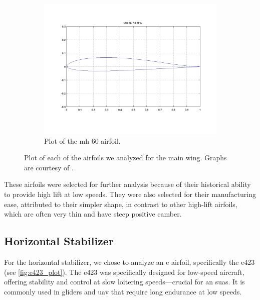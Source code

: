 \begin{figure}[htpb]
    \begin{subfigure}{0.49\textwidth}
        \centering
        \includegraphics[width=\textwidth]{Figures/MH_60.png}
        \caption{Plot of the \acrshort{mh} 60 airfoil.}
        \label{fig:mh_60_plot}
    \end{subfigure}
    \caption[Airfoil choices for wing]{Plot of each of the airfoils we analyzed for the main wing. Graphs are courtesy of \citet{uiuc2024}.}
    \label{fig:airfoil_plots}
\end{figure}

These airfoils were selected for further analysis because of their historical ability to provide high lift at low speeds. They were also selected for their manufacturing ease, attributed to their simpler shape, in contrast to other high-lift airfoils, which are often very thin and have steep positive camber.

\subsection{Horizontal Stabilizer}

For the horizontal stabilizer, we chose to analyze an \acrfull{e} airfoil, specifically the \acrshort{e}423 (see \autoref{fig:e423_plot}). The \acrshort{e}423 was specifically designed for low-speed aircraft, offering stability and control at slow loitering speeds—crucial for an \acrshort{suas}. It is commonly used in gliders and \acrshort{uav} that require long endurance at low speeds.

